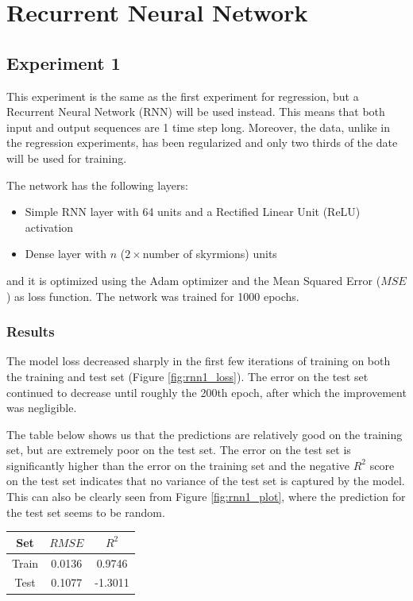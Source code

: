 \documentclass[a4paper]{article}
\begin{document}
  \section{Recurrent Neural Network}
  
  \subsection{Experiment 1}
  This experiment is the same as the first experiment for regression, but a Recurrent Neural Network (RNN) will be used instead. This means that both input and output sequences are 1 time step long. Moreover, the data, unlike in the regression experiments, has been regularized and only two thirds of the date will be used for training.

  The network has the following layers:
  \begin{itemize}
    \item Simple RNN layer with 64 units and a Rectified Linear Unit (ReLU) activation
    \item Dense layer with $n$ ($2 \times $number of skyrmions) units
  \end{itemize}
  and it is optimized using the Adam optimizer and the Mean Squared Error ($MSE$) as loss function. The network was trained for 1000 epochs.

  \subsubsection{Results}
  The model loss decreased sharply in the first few iterations of training on both the training and test set (Figure \ref{fig:rnn1_loss}). The error on the test set continued to decrease until roughly the 200th epoch, after which the improvement was negligible.

  The table below shows us that the predictions are relatively good on the training set, but are extremely poor on the test set. The error on the test set is significantly higher than the error on the training set and the negative $R^2$ score on the test set indicates that no variance of the test set is captured by the model. This can also be clearly seen from Figure \ref{fig:rnn1_plot}, where the prediction for the test set seems to be random.

  \begin{table}[h!]
    \centering
    \begin{tabular}{|c | c c|} 
     \hline
     Set & $RMSE$ & $R^2$ \\ [0.5ex] 
     \hline\hline
     Train & 0.0136 & 0.9746 \\ 
     Test & 0.1077 & -1.3011 \\
     \hline
    \end{tabular}
  \end{table}
\end{document}
